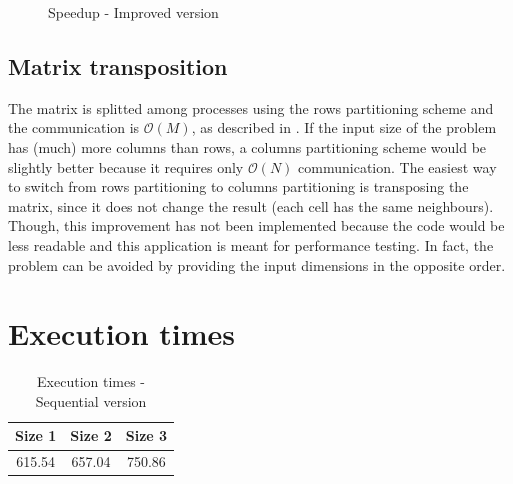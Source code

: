 \documentclass{article}
\begin{document}
\begin{figure}
\centering
{}
\caption{Speedup - Improved version}
\label{fig:speedupimproved}
\end{figure}


\subsection{Matrix transposition}
The matrix is splitted among processes using the rows partitioning scheme and the communication is $\mathcal{O}(M)$, as described in . If the input size of the problem has (much) more columns than rows, a columns partitioning scheme would be slightly better because it requires only $\mathcal{O}(N)$ communication. The easiest way to switch from rows partitioning to columns partitioning is transposing the matrix, since it does not change the result (each cell has the same neighbours). Though, this improvement has not been implemented because the code would be less readable and this application is meant for performance testing. In fact, the problem can be avoided by providing the input dimensions in the opposite order.

\appendix

\section{Execution times}

\begin{table}[H]
\centering
\begin{tabular}{|c|c|c|}
\hline
Size 1 & Size 2 & Size 3 \\
\hline
615.54 & 657.04 & 750.86 \\
\hline
\end{tabular}
\caption{Execution times - Sequential version} \label{tab:sequentialtimes}
\end{table}
\end{document}
